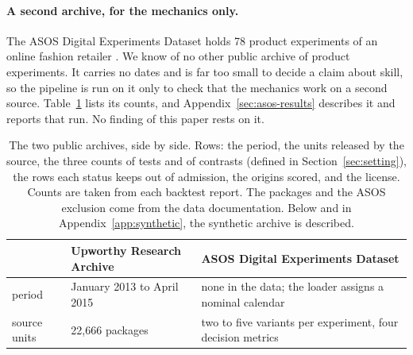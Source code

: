 \documentclass[sigconf,nonacm]{acmart}
\begin{document}
\paragraph{A second archive, for the mechanics only.} The ASOS Digital Experiments Dataset holds 78 product experiments of an online fashion retailer \cite{liu2021datasets}. We know of no other public archive of product experiments. It carries no dates and is far too small to decide a claim about skill, so the pipeline is run on it only to check that the mechanics work on a second source. Table~\ref{tab:fmt-archives} lists its counts, and Appendix~\ref{sec:asos-results} describes it and reports that run. No finding of this paper rests on it.

\begin{table}[t]\centering\scriptsize
\caption{The two public archives, side by side. Rows: the period, the units released by the source, the three counts of tests and of contrasts (defined in Section~\ref{sec:setting}), the rows each status keeps out of admission, the origins scored, and the license. Counts are taken from each backtest report. The packages and the ASOS exclusion come from the data documentation. Below and in Appendix~\ref{app:synthetic}, the synthetic archive is described.}
\label{tab:fmt-archives}
\begin{tabular}{p{}p{}p{}}
\toprule
 & Upworthy Research Archive & ASOS Digital Experiments Dataset \\
\midrule
period & January 2013 to April 2015 & none in the data; the loader assigns a nominal calendar \\
source units & 22,666 packages & two to five variants per experiment, four decision metrics \\

\end{tabular}
\end{table}
\end{document}

